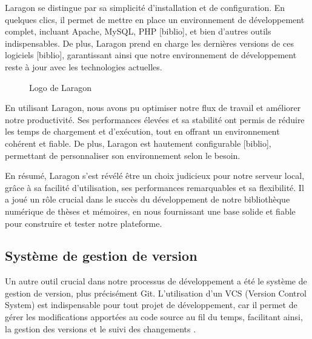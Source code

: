 Laragon se distingue par sa simplicité d'installation et de configuration. En quelques clics, il permet de mettre en place un environnement de développement complet, incluant Apache, MySQL, PHP [biblio], et bien d'autres outils indispensables. De plus, Laragon prend en charge les dernières versions de ces logiciels [biblio], garantissant ainsi que notre environnement de développement reste à jour avec les technologies actuelles.

\begin{figure}[H]%
    \center%
    \setlength{\fboxsep}{5pt}%
    \setlength{\fboxrule}{0.5pt}%
    \caption{Logo de Laragon}%
\end{figure}

En utilisant Laragon, nous avons pu optimiser notre flux de travail et améliorer notre productivité. Ses performances élevées et sa stabilité ont permis de réduire les temps de chargement et d'exécution, tout en offrant un environnement cohérent et fiable. De plus, Laragon est hautement configurable [biblio], permettant de personnaliser son environnement selon le besoin.

En résumé, Laragon s'est révélé être un choix judicieux pour notre serveur local, grâce à sa facilité d'utilisation, ses performances remarquables et sa flexibilité. Il a joué un rôle crucial dans le succès du développement de notre bibliothèque numérique de thèses et mémoires, en nous fournissant une base solide et fiable pour construire et tester notre plateforme.

\subsection{Système de gestion de version}
Un autre outil crucial dans notre processus de développement a été le système de gestion de version, plus précisément Git. L'utilisation d'un VCS (Version Control System) est indispensable pour tout projet de développement, car il permet de gérer les modifications apportées au code source au fil du temps, facilitant ainsi, la gestion des versions et le suivi des changements \cite{loeliger2012version}.
\par 


